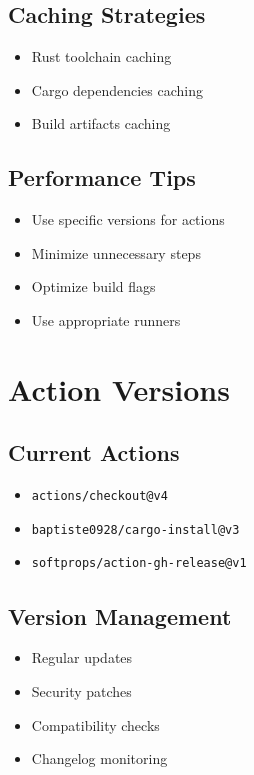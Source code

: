 \documentclass{article}
\begin{document}
\subsection{Caching Strategies}
\begin{itemize}
    \item Rust toolchain caching
    \item Cargo dependencies caching
    \item Build artifacts caching
\end{itemize}

\subsection{Performance Tips}
\begin{itemize}
    \item Use specific versions for actions
    \item Minimize unnecessary steps
    \item Optimize build flags
    \item Use appropriate runners
\end{itemize}

\section{Action Versions}

\subsection{Current Actions}
\begin{itemize}
    \item \texttt{actions/checkout@v4}
    \item \texttt{baptiste0928/cargo-install@v3}
    \item \texttt{softprops/action-gh-release@v1}
\end{itemize}

\subsection{Version Management}
\begin{itemize}
    \item Regular updates
    \item Security patches
    \item Compatibility checks
    \item Changelog monitoring
\end{itemize}
\end{document}
